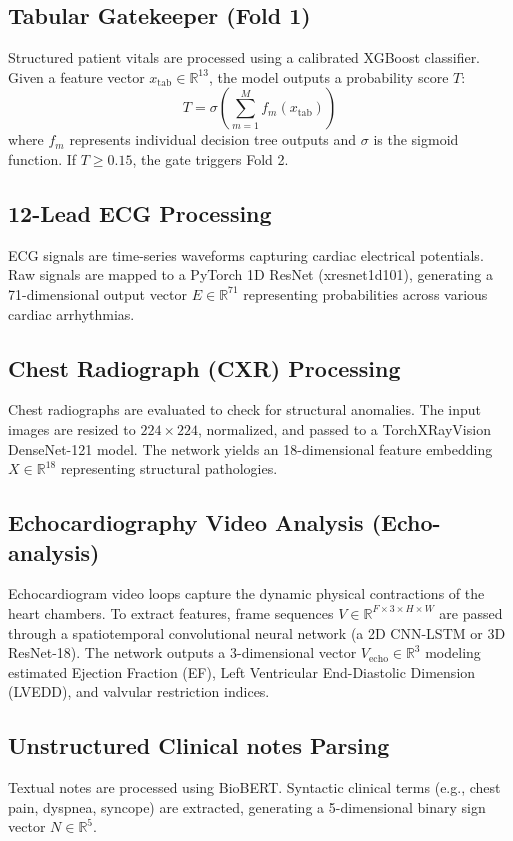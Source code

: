 \documentclass[11pt,onecolumn]{article}
\begin{document}
\subsection{Tabular Gatekeeper (Fold 1)}
Structured patient vitals are processed using a calibrated XGBoost classifier. Given a feature vector $x_{\text{tab}} \in \mathbb{R}^{13}$, the model outputs a probability score $T$:
\begin{equation}
T = \sigma \left( \sum_{m=1}^{M} f_m(x_{\text{tab}}) \right)
\end{equation}
where $f_m$ represents individual decision tree outputs and $\sigma$ is the sigmoid function. If $T \ge 0.15$, the gate triggers Fold 2.

\subsection{12-Lead ECG Processing}
ECG signals are time-series waveforms capturing cardiac electrical potentials. Raw signals are mapped to a PyTorch 1D ResNet (xresnet1d101), generating a 71-dimensional output vector $E \in \mathbb{R}^{71}$ representing probabilities across various cardiac arrhythmias.

\subsection{Chest Radiograph (CXR) Processing}
Chest radiographs are evaluated to check for structural anomalies. The input images are resized to $224 \times 224$, normalized, and passed to a TorchXRayVision DenseNet-121 model. The network yields an 18-dimensional feature embedding $X \in \mathbb{R}^{18}$ representing structural pathologies.

\subsection{Echocardiography Video Analysis (Echo-analysis)}
Echocardiogram video loops capture the dynamic physical contractions of the heart chambers. To extract features, frame sequences $V \in \mathbb{R}^{F \times 3 \times H \times W}$ are passed through a spatiotemporal convolutional neural network (a 2D CNN-LSTM or 3D ResNet-18). The network outputs a 3-dimensional vector $V_{\text{echo}} \in \mathbb{R}^3$ modeling estimated Ejection Fraction (EF), Left Ventricular End-Diastolic Dimension (LVEDD), and valvular restriction indices.

\subsection{Unstructured Clinical notes Parsing}
Textual notes are processed using BioBERT. Syntactic clinical terms (e.g., chest pain, dyspnea, syncope) are extracted, generating a 5-dimensional binary sign vector $N \in \mathbb{R}^5$.
\end{document}
